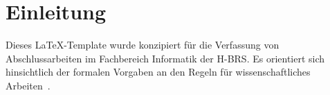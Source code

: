 \section{Einleitung}
\label{sec:intro}
Dieses \LaTeX-Template wurde konzipiert für die Verfassung von Abschlussarbeiten im Fachbereich Informatik der \ac{H-BRS}.
Es orientiert sich hinsichtlich der formalen Vorgaben an den Regeln für wissenschaftliches Arbeiten~\cite{Kees2017}.
